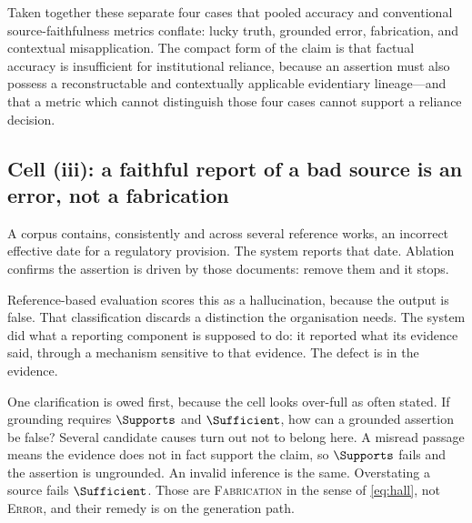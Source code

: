 Taken together these separate four cases that pooled accuracy and conventional
source-faithfulness metrics conflate: lucky truth, grounded error, fabrication, and
contextual misapplication. The compact form of the claim is that factual accuracy is
insufficient for institutional reliance, because an assertion must also possess a
reconstructable and contextually applicable evidentiary lineage---and that a metric
which cannot distinguish those four cases cannot support a reliance decision.


\subsection{Cell (iii): a faithful report of a bad source is an error, not a fabrication}
\label{sec:cell-iii}

A corpus contains, consistently and across several reference works, an incorrect
effective date for a regulatory provision. The system reports that date. Ablation
confirms the assertion is driven by those documents: remove them and it stops.

Reference-based evaluation scores this as a hallucination, because the output is
false.
That classification discards a distinction the organisation needs. The system did
what a reporting component is supposed to do: it reported what its evidence said,
through a mechanism sensitive to that evidence. The defect is in the evidence.

One clarification is owed first, because the cell looks over-full as often stated. If
grounding requires $\Supports$ and $\Sufficient$, how can a grounded assertion be false?
Several candidate causes turn out not to belong here. A misread passage means the evidence
does not in fact support the claim, so $\Supports$ fails and the assertion is ungrounded.
An invalid inference is the same. Overstating a source fails $\Sufficient$. Those are
\textsc{Fabrication} in the sense of \eqref{eq:hall}, not \textsc{Error}, and their remedy
is on the generation path.

